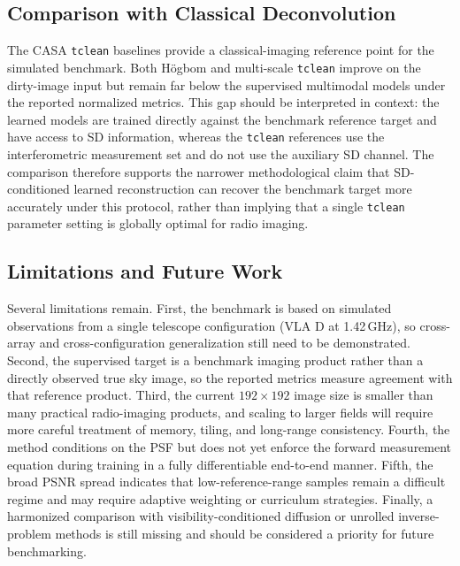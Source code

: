 \documentclass[twocolumn]{aastex631}
\begin{document}
\subsection{Comparison with Classical Deconvolution}

The CASA \texttt{tclean} baselines provide a classical-imaging reference point for the simulated benchmark.
Both H{\"o}gbom and multi-scale \texttt{tclean} improve on the dirty-image input but remain far below the supervised multimodal models under the reported normalized metrics.
This gap should be interpreted in context: the learned models are trained directly against the benchmark reference target and have access to SD information, whereas the \texttt{tclean} references use the interferometric measurement set and do not use the auxiliary SD channel.
The comparison therefore supports the narrower methodological claim that SD-conditioned learned reconstruction can recover the benchmark target more accurately under this protocol, rather than implying that a single \texttt{tclean} parameter setting is globally optimal for radio imaging.

\subsection{Limitations and Future Work}

Several limitations remain.
First, the benchmark is based on simulated observations from a single telescope configuration (VLA D at 1.42\,GHz), so cross-array and cross-configuration generalization still need to be demonstrated.
Second, the supervised target is a benchmark imaging product rather than a directly observed true sky image, so the reported metrics measure agreement with that reference product.
Third, the current $192 \times 192$ image size is smaller than many practical radio-imaging products, and scaling to larger fields will require more careful treatment of memory, tiling, and long-range consistency.
Fourth, the method conditions on the PSF but does not yet enforce the forward measurement equation during training in a fully differentiable end-to-end manner.
Fifth, the broad PSNR spread indicates that low-reference-range samples remain a difficult regime and may require adaptive weighting or curriculum strategies.
Finally, a harmonized comparison with visibility-conditioned diffusion or unrolled inverse-problem methods is still missing and should be considered a priority for future benchmarking.

\end{document}
